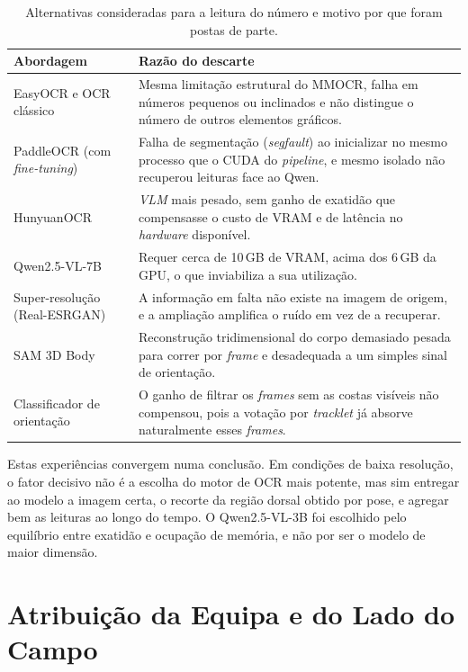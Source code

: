 \begin{table}[htbp]
\centering
\caption{Alternativas consideradas para a leitura do número e motivo por que foram postas de parte.}
\label{tab:alternativas}
\renewcommand{\arraystretch}{1.35}
\setlength{\tabcolsep}{6pt}
\begin{tabular}{|p{3.6cm}|p{9.0cm}|}
\hline
\textbf{Abordagem} & \textbf{Razão do descarte} \\
\hline
EasyOCR e OCR clássico &
Mesma limitação estrutural do MMOCR, falha em números pequenos ou inclinados e não
distingue o número de outros elementos gráficos. \\
\hline
PaddleOCR (com \emph{fine-tuning}) &
Falha de segmentação (\emph{segfault}) ao inicializar no mesmo processo que o CUDA do
\emph{pipeline}, e mesmo isolado não recuperou leituras face ao Qwen. \\
\hline
HunyuanOCR &
\emph{VLM} mais pesado, sem ganho de exatidão que compensasse o custo de VRAM e de
latência no \emph{hardware} disponível. \\
\hline
Qwen2.5-VL-7B &
Requer cerca de 10\,GB de VRAM, acima dos 6\,GB da GPU, o que inviabiliza a sua
utilização. \\
\hline
Super-resolução (\mbox{Real-ESRGAN}) &
A informação em falta não existe na imagem de origem, e a ampliação amplifica o ruído
em vez de a recuperar. \\
\hline
SAM 3D Body &
Reconstrução tridimensional do corpo demasiado pesada para correr por \emph{frame} e
desadequada a um simples sinal de orientação. \\
\hline
Classificador de orientação &
O ganho de filtrar os \emph{frames} sem as costas visíveis não compensou, pois a votação
por \emph{tracklet} já absorve naturalmente esses \emph{frames}. \\
\hline
\end{tabular}
\end{table}


Estas experiências convergem numa conclusão. Em condições de baixa resolução, o fator decisivo não é a escolha do motor de OCR mais potente, mas sim entregar ao modelo a imagem certa, o recorte da região dorsal obtido por pose, e agregar bem as leituras ao longo do tempo. O Qwen2.5-VL-3B foi escolhido pelo equilíbrio entre exatidão e ocupação de memória, e não por ser o modelo de maior dimensão.


\section{Atribuição da Equipa e do Lado do Campo}\label{sec:met-equipa}

